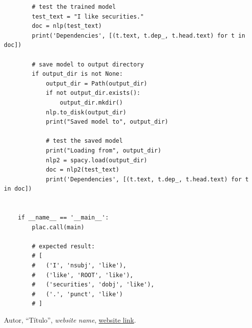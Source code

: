 \documentclass[12pt]{article}
\begin{document}
\begin{verbatim}
		# test the trained model
		test_text = "I like securities."
		doc = nlp(test_text)
		print('Dependencies', [(t.text, t.dep_, t.head.text) for t in doc])

		# save model to output directory
		if output_dir is not None:
			output_dir = Path(output_dir)
			if not output_dir.exists():
				output_dir.mkdir()
			nlp.to_disk(output_dir)
			print("Saved model to", output_dir)

			# test the saved model
			print("Loading from", output_dir)
			nlp2 = spacy.load(output_dir)
			doc = nlp2(test_text)
			print('Dependencies', [(t.text, t.dep_, t.head.text) for t in doc])


	if __name__ == '__main__':
		plac.call(main)

		# expected result:
		# [
		#   ('I', 'nsubj', 'like'),
		#   ('like', 'ROOT', 'like'),
		#   ('securities', 'dobj', 'like'),
		#   ('.', 'punct', 'like')
		# ]
\end{verbatim}


\newpage

\begin{thebibliography}{99}
	
	Autor,
	``Título'',
	\textit{website name},
	\url{website link}.
	
\end{thebibliography}
\end{document}
